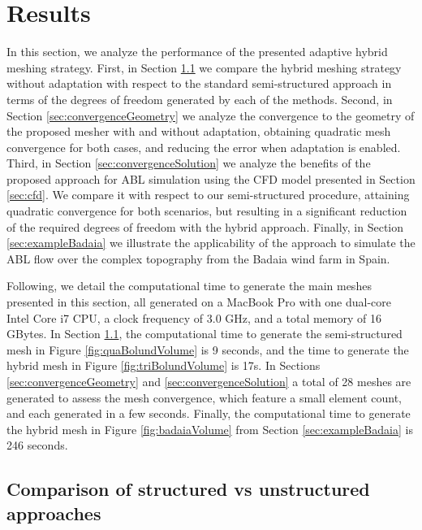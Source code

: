 \documentclass[1p]{elsarticle}
\begin{document}

\section{Results}
\label{sec:results}

In this section, we analyze the performance of the presented adaptive hybrid meshing strategy.
First, in Section \ref{sec:exampleBolund} we compare the hybrid meshing strategy without adaptation with respect to the standard semi-structured approach in terms of the degrees of freedom generated by each of the methods.
Second, in Section \ref{sec:convergenceGeometry} we analyze the convergence to the geometry of the proposed mesher with and without adaptation, obtaining quadratic mesh convergence for both cases, and reducing the error when adaptation is enabled.
Third, in Section \ref{sec:convergenceSolution} we analyze the benefits of the proposed approach for ABL simulation using the CFD model presented in Section \ref{sec:cfd}.  We compare it with respect to our semi-structured procedure, attaining quadratic convergence for both scenarios, but resulting in a significant reduction of the required degrees of freedom with the hybrid approach.
Finally, in Section \ref{sec:exampleBadaia} we illustrate the applicability of the approach to simulate the ABL flow over the complex topography from
 the Badaia wind farm in Spain.

Following, we detail the computational time to generate the main meshes presented in this section, all generated on a MacBook Pro with one dual-core Intel Core i7 CPU,  a clock frequency of 3.0 GHz, and a total memory of 16 GBytes.
In Section \ref{sec:exampleBolund}, the computational time to generate the semi-structured mesh in Figure \ref{fig:quaBolundVolume} is 9 seconds, and the time to generate the hybrid mesh in Figure \ref{fig:triBolundVolume} is 17s.
In Sections \ref{sec:convergenceGeometry} and \ref{sec:convergenceSolution} a total of 28 meshes are generated to assess the mesh convergence, 
which feature a small element count,
 and each generated in a few seconds.
Finally, the computational time to generate the hybrid mesh in Figure \ref{fig:badaiaVolume} from Section \ref{sec:exampleBadaia} is 246 seconds.


\subsection{Comparison of structured vs unstructured approaches} 
\label{sec:exampleBolund}
\end{document}
